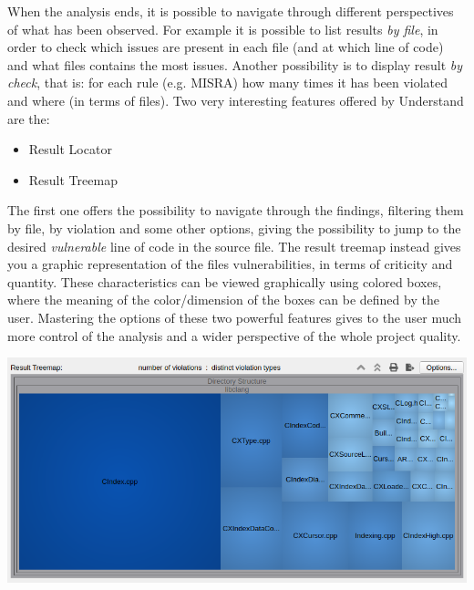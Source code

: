 When the analysis ends, it is possible to navigate through different perspectives of what has been observed. For example it is possible to list results \textsl{by file}, in order to check which issues are present in each file (and at which line of code) and what files contains the most issues. Another possibility is to display result \textsl{by check}, that is: for each rule (e.g. MISRA) how many times it has been violated and where (in terms of files).\newline
Two very interesting features offered by Understand are the:
\begin{itemize}
	\item Result Locator
	\item Result Treemap
\end{itemize}

The first one offers the possibility to navigate through the findings, filtering them by file, by violation and some other options, giving the possibility to jump to the desired \textsl{vulnerable} line of code in the source file.\newline
The result treemap instead gives you a graphic representation of the files vulnerabilities, in terms of criticity and quantity. These characteristics can be viewed graphically using colored boxes, where the meaning of the color/dimension of the boxes can be defined by the user.\newline
Mastering the options of these two powerful features gives to the user much more control of the analysis and a wider perspective of the whole project quality.\newline\newline

\vspace{1cm}
\begin{minipage}{\linewidth}
	\includegraphics[width=\textwidth]{img/AllChecksTreeMap.png}
\end{minipage}
\vspace{1cm}

